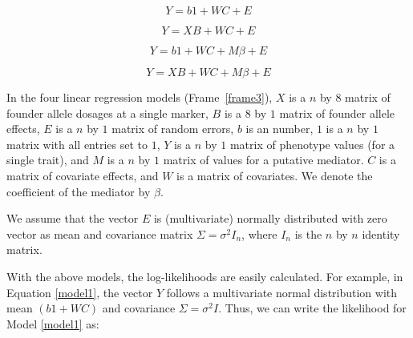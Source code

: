 \documentclass[oneside]{book}
\newenvironment{frameenv}[1]
    {\begin{myfloat}[tb]
    \begin{mdframed}[roundcorner=10pt,backgroundcolor=blue!10]
    \caption{#1}
    }
    {%
    \end{mdframed}\end{myfloat}
    }
\begin{document}
\begin{frameenv}{Four regressions for a single mediation analysis}\label{frame3}


\begin{equation}
Y = b1 + WC + E
\label{model1}
\end{equation}

\begin{equation}
Y = XB + WC + E
\label{model2}
\end{equation}

\begin{equation}
Y = b1 + WC + M\beta + E
\label{model3}
\end{equation}

\begin{equation}
Y = XB + WC + M\beta + E
\label{model4}
\end{equation}
\end{frameenv}

In the four linear regression models (Frame~\ref{frame3}), $X$ is a $n$ by $8$ matrix of founder allele dosages at a single marker, $B$ is a $8$ by $1$ matrix of founder allele effects, $E$ is a $n$ by $1$ matrix of random errors, $b$ is an number, $1$ is a $n$ by $1$ matrix with all entries set to $1$, $Y$ is a $n$ by $1$ matrix of phenotype values (for a single trait), and $M$ is a $n$ by $1$ matrix of values for a putative mediator. $C$ is a matrix of covariate effects, and $W$ is a matrix of covariates. We denote the coefficient of the mediator by $\beta$.

We assume that the vector $E$ is (multivariate) normally distributed with zero vector as mean and covariance matrix $\Sigma = \sigma^2I_n$, where $I_n$ is the $n$ by $n$ identity matrix.

With the above models, the log-likelihoods are easily calculated. For example, in Equation \ref{model1}, the vector $Y$ follows a multivariate normal distribution with mean $(b1 + WC)$ and covariance $\Sigma = \sigma^2I$. Thus, we can write the likelihood for Model \ref{model1} as:
\end{document}
